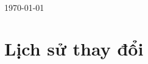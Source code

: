 \documentclass[12pt]{article}
\begin{document}
\begin{titlepage}
		\hfill\\[4cm]
		
		{\large \today}\\[3cm] %
		
		
		
		\vfill %
		
	\end{titlepage}
	
	
	\tableofcontents
	\newpage
	\section*{Lịch sử thay đổi}
\end{document}

